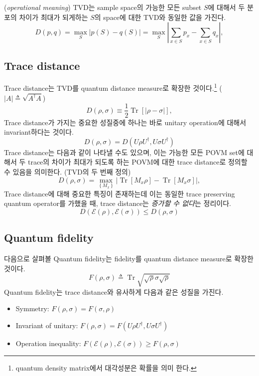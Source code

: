 (\textit{operational meaning}) TVD는 sample space의 가능한 모든 subset $S$에 대해서 두 분포의 차이가 최대가 되게하는 $S$의 space에 대한 TVD와 동일한 값을 가진다.
\begin{equation*}
    D(p, q)=\max _S|p(S)-q(S)|=\max _S\left|\sum_{x \in S} p_x-\sum_{x \in S} q_x\right|,
\end{equation*}


\subsection{Trace distance}
Trace distance는 TVD를 quantum distance measure로 확장한 것이다.\footnote{quantum density matrix에서 대각성분은 확률을 의미 한다.} ($|A| \triangleq \sqrt{A^\dagger A}$)
\begin{equation*}
    D(\rho, \sigma) \equiv \frac{1}{2} \operatorname{Tr}[|\rho-\sigma|],
\end{equation*}
Trace distance가 가지는 중요한 성질중에 하나는 바로 unitary operation에 대해서 invariant하다는 것이다.
\begin{equation*}
    D(\rho, \sigma)=D(U\rho U^\dagger, U\sigma U^\dagger)
\end{equation*}
Trace distance는 다음과 같이 나타낼 수도 있으며, 이는 가능한 모든 POVM set에 대해서 두 trace의 차이가 최대가 되도록 하는 POVM에 대한 trace distance로 정의할 수 있음을 의미한다. (TVD의 두 번째 정의)
\begin{equation*}
    D(\rho, \sigma)=\max _{\left\{M_x\right\}}\left|\operatorname{Tr}\left[M_x \rho\right]-\operatorname{Tr}\left[M_x \sigma\right]\right|,
\end{equation*}
Trace distance에 대해 중요한 특징이 존재하는데 이는 동일한 trace preserving quantum operator를 가했을 때, trace distance는 \textit{증가할 수 없다}는 정리이다.
\begin{equation*}
    D(\mathcal{E}(\rho), \mathcal{E}(\sigma)) \leq D(\rho, \sigma) 
\end{equation*}

\subsection{Quantum fidelity} \label{sec:quantum-fidelity}
다음으로 살펴볼 Quantum fidelity는 fidelity를 quantum distance measure로 확장한 것이다.
\begin{equation*}
    F(\rho, \sigma) \triangleq \operatorname{Tr} \sqrt{\sqrt{\rho} \sigma \sqrt{\rho}}
\end{equation*}
Quantum fidelity는 trace distance와 유사하게 다음과 같은 성질을 가진다.
\begin{itemize}
    \item Symmetry: $F(\rho, \sigma)=F(\sigma, \rho)$
    \item Invariant of unitary: $F(\rho, \sigma)=F(U\rho U^\dagger, U\sigma U^\dagger)$
    \item Operation inequality: $F(\mathcal{E}(\rho), \mathcal{E}(\sigma)) \geq F(\rho, \sigma)$
\end{itemize}

